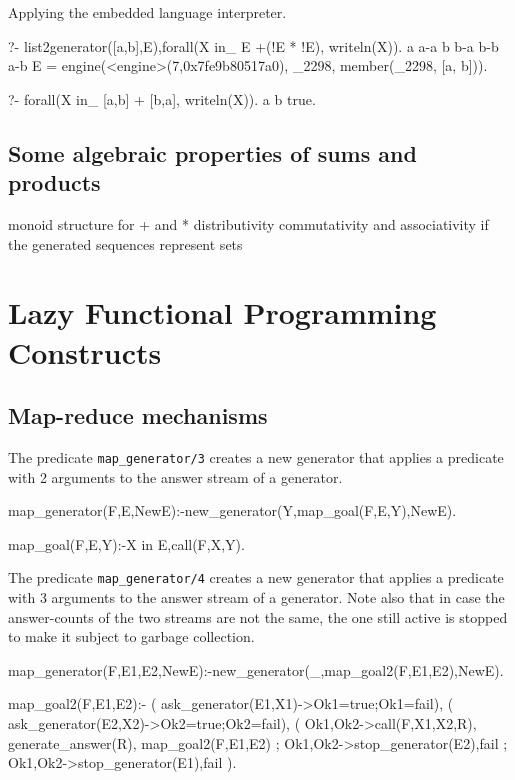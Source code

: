 \documentclass{new_tlp}
\begin{document}
\BX
Applying the embedded language interpreter.
\begin{codex}
?- list2generator([a,b],E),forall(X in_ E +(!E * !E), writeln(X)).
a
a-a
b
b-a
b-b
a-b
E = engine(<engine>(7,0x7fe9b80517a0), _2298, member(_2298, [a, b])).

?- forall(X in_ {[a,b] + [b,a]}, writeln(X)).
a
b
true.
\end{codex}

\EX
\subsection{Some algebraic properties of sums and products}

\BI
\I monoid structure for + and *
\I distributivity
\I commutativity and associativity if the generated sequences represent sets
\EI

\begin{code}
\end{code}

\section{Lazy Functional Programming Constructs}

\subsection{Map-reduce mechanisms}

The predicate {\tt map\_generator/3} creates a new generator that
applies a predicate with 2 arguments to the answer stream  of a generator.
\begin{code}
map_generator(F,E,NewE):-new_generator(Y,map_goal(F,E,Y),NewE).

map_goal(F,E,Y):-X in E,call(F,X,Y).
\end{code}

The predicate {\tt map\_generator/4} creates a new generator that
applies a predicate with 3 arguments to the answer stream  of a generator.
Note also that in case the answer-counts of the two streams are not the same, the one
still active is stopped to make it subject to garbage collection.
\begin{code}
map_generator(F,E1,E2,NewE):-new_generator(_,map_goal2(F,E1,E2),NewE).

map_goal2(F,E1,E2):-
  ( ask_generator(E1,X1)->Ok1=true;Ok1=fail),
  ( ask_generator(E2,X2)->Ok2=true;Ok2=fail),
  ( Ok1,Ok2->call(F,X1,X2,R),
    generate_answer(R),
    map_goal2(F,E1,E2)
  ; \+Ok1,Ok2->stop_generator(E2),fail
  ; Ok1,\+Ok2->stop_generator(E1),fail
  ).
\end{code}
\end{document}
